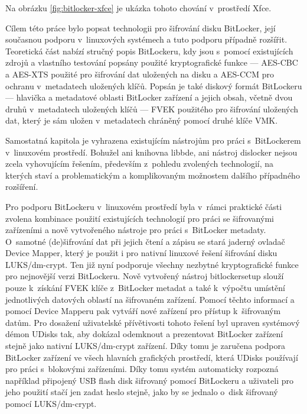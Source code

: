 Na obrázku \ref{fig:bitlocker-xfce} je ukázka tohoto chování v~prostředí Xfce.



Cílem této práce bylo popsat technologii pro šifrování disku BitLocker, její současnou podporu v~linuxových systémech a tuto podporu případně rozšířit. Teoretická část nabízí stručný popis BitLockeru, kdy jsou s~pomocí existujících zdrojů a vlastního testování popsány použité kryptografické funkce --- AES-CBC a AES-XTS použité pro šifrování dat uložených na disku a AES-CCM pro ochranu v~metadatech uložených klíčů. Popsán je také diskový formát BitLockeru --- hlavička a metadatové oblasti BitLocker zařízení a jejich obsah, včetně dvou druhů v~metadatech uložených klíčů --- FVEK použitého pro šifrování uložených dat, který je sám uložen v~metadatech chráněný pomocí druhé klíče VMK.

Samostatná kapitola je vyhrazena existujícím nástrojům pro práci s~BitLockerem v~linuxovém prostředí. Bohužel ani knihovna libbde, ani nástroj dislocker nejsou zcela vyhovujícím řešením, především z~pohledu zvolených technologií, na kterých staví a problematickým a komplikovaným možnostem dalšího případného rozšíření.

Pro podporu BitLockeru v~linuxovém prostředí byla v~rámci praktické části zvolena kombinace použití existujících technologií pro práci se šifrovanými zařízeními a nově vytvořeného nástroje pro práci s~BitLocker metadaty. O~samotné (de)šifrování dat při jejich čtení a zápisu se stará jaderný ovladač Device Mapper, který je použit i pro nativní linuxové řešení šifrování disku LUKS/dm-crypt. Ten již nyní podporuje všechny nezbytné kryptografické funkce pro nejnovější verzi BitLockeru. Nově vytvořený nástroj bitlockersetup slouží pouze k~získání FVEK klíče z~BitLocker metadat a také k~výpočtu umístění jednotlivých datových oblastí na šifrovaném zařízení. Pomocí těchto informací a pomocí Device Mapperu pak vytváří nové zařízení pro přístup k~šifrovaným datům. Pro dosažení uživatelské přívětivosti tohoto řešení byl upraven systémový démon \mbox{UDisks} tak, aby dokázal odemknout a prezentovat BitLocker zařízení stejně jako nativní LUKS/dm-crypt zařízení. Díky tomu je zaručena podpora BitLocker zařízení ve všech hlavních grafických prostředí, která UDisks používají pro práci s~blokovými zařízeními. Díky tomu systém automaticky rozpozná například připojený USB flash disk šifrovaný pomocí BitLockeru a uživateli pro jeho použití stačí jen zadat heslo stejně, jako by se jednalo o~disk šifrovaný pomocí LUKS/dm-crypt.

